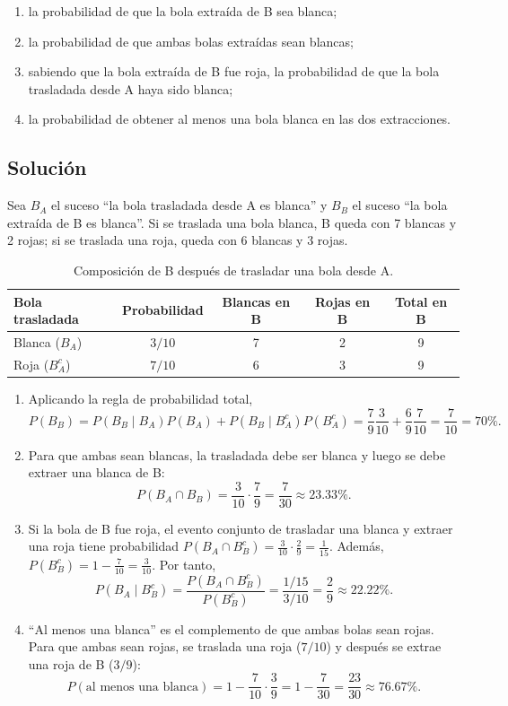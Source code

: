 \documentclass[12pt]{article}
\begin{document}
\begin{enumerate}
    \item la probabilidad de que la bola extraída de B sea blanca;
    \item la probabilidad de que ambas bolas extraídas sean blancas;
    \item sabiendo que la bola extraída de B fue roja, la probabilidad de que la bola trasladada desde A haya sido blanca;
    \item la probabilidad de obtener al menos una bola blanca en las dos extracciones.
\end{enumerate}

\subsection*{Solución}

Sea $B_A$ el suceso ``la bola trasladada desde A es blanca'' y $B_B$ el suceso ``la bola extraída de B es blanca''. Si se traslada una bola blanca, B queda con 7 blancas y 2 rojas; si se traslada una roja, queda con 6 blancas y 3 rojas.

\begin{table}[H]
\centering
\small
\renewcommand{\arraystretch}{1.15}
\begin{tabular}{|l|c|c|c|c|}
\hline
\textbf{Bola trasladada} & \textbf{Probabilidad} & \textbf{Blancas en B} & \textbf{Rojas en B} & \textbf{Total en B} \\ \hline
Blanca ($B_A$) & $3/10$ & 7 & 2 & 9 \\ \hline
Roja ($B_A^c$) & $7/10$ & 6 & 3 & 9 \\ \hline
\end{tabular}
\caption{Composición de B después de trasladar una bola desde A.}
\label{tab:bolsas-composicion}
\end{table}

\begin{enumerate}
    \item Aplicando la regla de probabilidad total,
    \[
    P(B_B)=P(B_B\mid B_A)P(B_A)+P(B_B\mid B_A^c)P(B_A^c)
    =\frac{7}{9}\frac{3}{10}+\frac{6}{9}\frac{7}{10}
    =\frac{7}{10}=70\%.
    \]
    \item Para que ambas sean blancas, la trasladada debe ser blanca y luego se debe extraer una blanca de B:
    \[
    P(B_A\cap B_B)=\frac{3}{10}\cdot\frac{7}{9}
    =\frac{7}{30}\approx23.33\%.
    \]
    \item Si la bola de B fue roja, el evento conjunto de trasladar una blanca y extraer una roja tiene probabilidad
    $P(B_A\cap B_B^c)=\frac{3}{10}\cdot\frac{2}{9}=\frac{1}{15}$. Además,
    $P(B_B^c)=1-\frac{7}{10}=\frac{3}{10}$. Por tanto,
    \[
    P(B_A\mid B_B^c)=\frac{P(B_A\cap B_B^c)}{P(B_B^c)}
    =\frac{1/15}{3/10}=\frac{2}{9}\approx22.22\%.
    \]
    \item ``Al menos una blanca'' es el complemento de que ambas bolas sean rojas. Para que ambas sean rojas, se traslada una roja ($7/10$) y después se extrae una roja de B ($3/9$):
    \[
    P(\text{al menos una blanca})=1-\frac{7}{10}\cdot\frac{3}{9}
    =1-\frac{7}{30}=\frac{23}{30}\approx76.67\%.
    \]
\end{enumerate}
\end{document}
